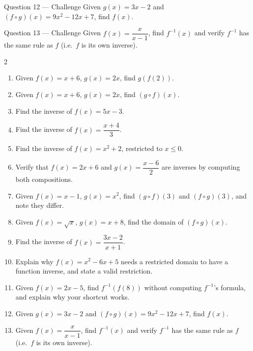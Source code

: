 \documentclass[11pt]{article}
\begin{document}
\begin{qbox}{Question 12 --- Challenge}
Given $g(x)=3x-2$ and $(f\circ g)(x)=9x^2-12x+7$, find $f(x)$.\workspace{3.4cm}
\end{qbox}

\begin{qbox}{Question 13 --- Challenge}
Given $f(x)=\dfrac{x}{x-1}$, find $f^{-1}(x)$ and verify $f^{-1}$ has the same rule as $f$ (i.e.\ $f$ is its own inverse).\workspace{3.4cm}
\end{qbox}

\clearpage
{}

\begin{recapbox}
\begin{multicols}{2}
\small
\begin{enumerate}[leftmargin=*,itemsep=3pt]
  \item Given $f(x)=x+6$, $g(x)=2x$, find $g(f(2))$.
  \item Given $f(x)=x+6$, $g(x)=2x$, find $(g\circ f)(x)$.
  \item Find the inverse of $f(x)=5x-3$.
  \item Find the inverse of $f(x)=\dfrac{x+4}{3}$.
  \item Find the inverse of $f(x)=x^2+2$, restricted to $x\leq0$.
  \item Verify that $f(x)=2x+6$ and $g(x)=\dfrac{x-6}{2}$ are inverses by computing both compositions.
  \item Given $f(x)=x-1$, $g(x)=x^2$, find $(g\circ f)(3)$ and $(f\circ g)(3)$, and note they differ.
  \item Given $f(x)=\sqrt{x}$, $g(x)=x+8$, find the domain of $(f\circ g)(x)$.
  \item Find the inverse of $f(x)=\dfrac{3x-2}{x+1}$.
  \item Explain why $f(x)=x^2-6x+5$ needs a restricted domain to have a function inverse, and state a valid restriction.
  \item Given $f(x)=2x-5$, find $f^{-1}(f(8))$ without computing $f^{-1}$'s formula, and explain why your shortcut works.
  \item Given $g(x)=3x-2$ and $(f\circ g)(x)=9x^2-12x+7$, find $f(x)$.
  \item Given $f(x)=\dfrac{x}{x-1}$, find $f^{-1}(x)$ and verify $f^{-1}$ has the same rule as $f$ (i.e.\ $f$ is its own inverse).
\end{enumerate}
\end{multicols}
\end{recapbox}
\end{document}
